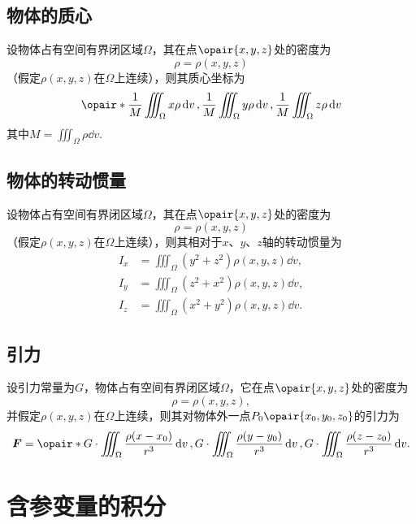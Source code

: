 \subsection{物体的质心}
\begin{theorem}
设物体占有空间有界闭区域\(\Omega\)，其在点\(\opair{x,y,z}\)处的密度为\[
\rho=\rho(x,y,z)
\]（假定\(\rho(x,y,z)\)在\(\Omega\)上连续），则其质心坐标为\begin{equation}
\opair*{
\frac{1}{M} \iiint_{\Omega} x \rho \dd{v},
\frac{1}{M} \iiint_{\Omega} y \rho \dd{v},
\frac{1}{M} \iiint_{\Omega} z \rho \dd{v}
}
\end{equation}其中\(M = \iiint_{\Omega} \rho \dd{v}\).
\end{theorem}

\subsection{物体的转动惯量}
\begin{theorem}
设物体占有空间有界闭区域\(\Omega\)，其在点\(\opair{x,y,z}\)处的密度为\[
\rho=\rho(x,y,z)
\]（假定\(\rho(x,y,z)\)在\(\Omega\)上连续），则其相对于\(x\)、\(y\)、\(z\)轴的转动惯量为\begin{align}
I_x &= \iiint_{\Omega} (y^2+z^2) \rho(x,y,z) \dd{v}, \\
I_y &= \iiint_{\Omega} (z^2+x^2) \rho(x,y,z) \dd{v}, \\
I_z &= \iiint_{\Omega} (x^2+y^2) \rho(x,y,z) \dd{v}.
\end{align}
\end{theorem}

\subsection{引力}
\begin{theorem}
设引力常量为\(G\)，物体占有空间有界闭区域\(\Omega\)，它在点\(\opair{x,y,z}\)处的密度为\[
\rho=\rho(x,y,z),
\]并假定\(\rho(x,y,z)\)在\(\Omega\)上连续，则其对物体外一点\(P_0\opair{x_0,y_0,z_0}\)的引力为\begin{equation}
\mat{F}
= \opair*{
G \cdot \iiint_{\Omega} \frac{\rho (x-x_0)}{r^3} \dd{v},
G \cdot \iiint_{\Omega} \frac{\rho (y-y_0)}{r^3} \dd{v},
G \cdot \iiint_{\Omega} \frac{\rho (z-z_0)}{r^3} \dd{v}
}.
\end{equation}
\end{theorem}

\section{含参变量的积分}
